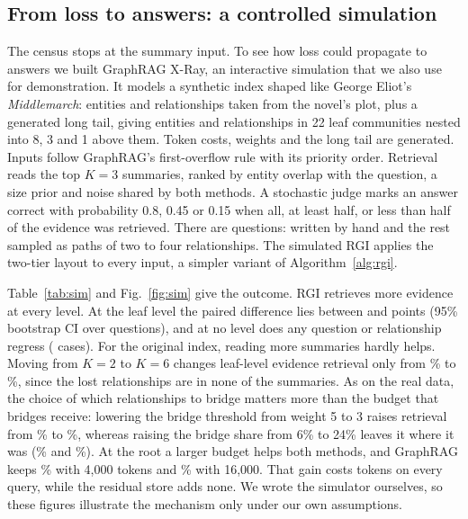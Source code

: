 \documentclass{ieeeaccess}
\theoremstyle{remark}
\begin{document}
\subsection{From loss to answers: a controlled simulation}\label{sec:sim}
The census stops at the summary input. To see how loss could propagate to answers we built GraphRAG X-Ray, an interactive simulation that we also use for demonstration. It models a synthetic index shaped like George Eliot's \emph{Middlemarch}: \SimCoreEntities{} entities and \SimCoreRels{} relationships taken from the novel's plot, plus a generated long tail, giving \SimEntities{} entities and \SimRels{} relationships in 22 leaf communities nested into 8, 3 and 1 above them. Token costs, weights and the long tail are generated. Inputs follow GraphRAG's first-overflow rule with its priority order. Retrieval reads the top $K=3$ summaries, ranked by entity overlap with the question, a size prior and noise shared by both methods. A stochastic judge marks an answer correct with probability 0.8, 0.45 or 0.15 when all, at least half, or less than half of the evidence was retrieved. There are \SimQuestions{} questions: \SimFeatured{} written by hand and the rest sampled as paths of two to four relationships. The simulated RGI applies the two-tier layout to every input, a simpler variant of Algorithm~\ref{alg:rgi}.

Table~\ref{tab:sim} and Fig.~\ref{fig:sim} give the outcome. RGI retrieves more evidence at every level. At the leaf level the paired difference lies between \SimCIALo{} and \SimCIAHi{} points (95\% bootstrap CI over questions), and at no level does any question or relationship regress (\SimRegr{} cases). For the original index, reading more summaries hardly helps. Moving from $K=2$ to $K=6$ changes leaf-level evidence retrieval only from \SimKTwoO\% to \SimKSixO\%, since the lost relationships are in none of the summaries. As on the real data, the choice of which relationships to bridge matters more than the budget that bridges receive: lowering the bridge threshold from weight 5 to 3 raises retrieval from \SimBMFive\% to \SimBMThree\%, whereas raising the bridge share from 6\% to 24\% leaves it where it was (\SimBSSix\% and \SimBSTwentyFour\%). At the root a larger budget helps both methods, and GraphRAG keeps \SimBudFourO\% with 4,000 tokens and \SimBudSixteenO\% with 16,000. That gain costs tokens on every query, while the residual store adds none. We wrote the simulator ourselves, so these figures illustrate the mechanism only under our own assumptions.
\end{document}
